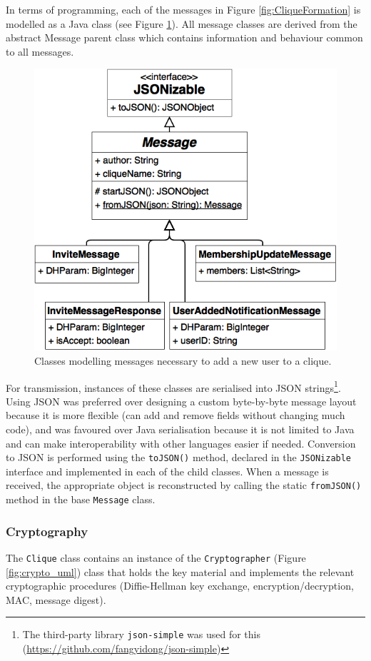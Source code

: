 \documentclass[a4paper, twoside, 12pt]{report}
\begin{document}
In terms of programming, each of the messages in Figure \ref{fig:CliqueFormation} is modelled as a Java class (see Figure \ref{fig:messages_uml}). All message classes are derived from the abstract Message parent class which contains information and behaviour common to all messages.

\begin{figure}[H]
    \centering
    \includegraphics[width=0.6\linewidth]{pics/messages_uml.png}
    \caption{\label{fig:messages_uml} Classes modelling messages necessary to add a new user to a clique.}
\end{figure}

For transmission, instances of these classes are serialised into JSON strings\footnote{The third-party library \texttt{json-simple} was used for this (\url{https://github.com/fangyidong/json-simple})}. Using JSON was preferred over designing a custom byte-by-byte message layout because it is more flexible (can add and remove fields without changing much code), and was favoured over Java serialisation because it is not limited to Java and can make interoperability with other languages easier if needed. Conversion to JSON is performed using the \texttt{toJSON()} method, declared in the \texttt{JSONizable} interface and implemented in each of the child classes. When a message is received, the appropriate object is reconstructed by calling the static \texttt{fromJSON()} method in the base \texttt{Message} class. \\

\subsubsection{Cryptography}
The \texttt{Clique} class contains an instance of the \texttt{Cryptographer} (Figure \ref{fig:crypto_uml}) class that holds the key material and implements the relevant cryptographic procedures (Diffie-Hellman key exchange, encryption/decryption, MAC, message digest).
\end{document}

